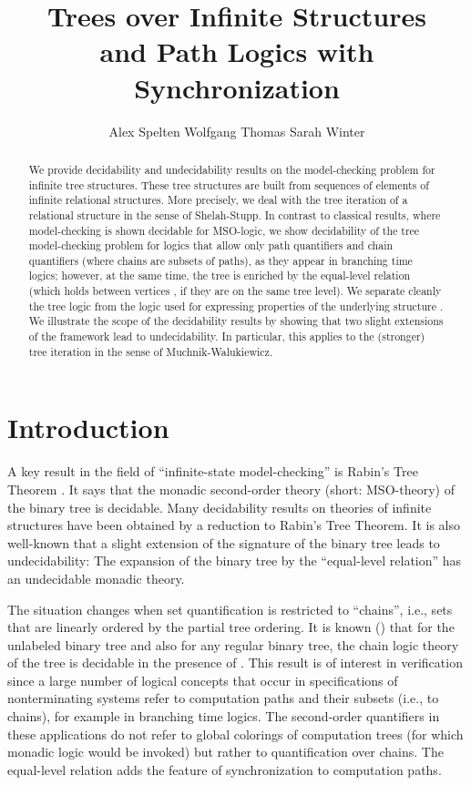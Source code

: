 \documentclass[copyright,creativecommons]{eptcs}
\title{Trees over Infinite Structures \\ and Path Logics with Synchronization}
\author{Alex Spelten \qquad Wolfgang Thomas \qquad Sarah Winter
\institute{RWTH Aachen University\\ Germany}
\email{\{spelten,thomas,winter\}@automata.rwth-aachen.de}
}
\theoremstyle{plain}
\theoremstyle{nonumberplain}
\begin{document}
\maketitle

\begin{abstract}
We provide decidability and undecidability results on 
the model-checking problem for infinite tree structures. 
These tree structures are built from sequences of  
elements of infinite relational structures. More 
precisely, we deal with the tree iteration of a relational 
structure  in the sense of Shelah-Stupp. 
In contrast to classical results, where 
model-checking is shown decidable for MSO-logic, we 
show decidability of the tree model-checking problem 
for logics that allow only path quantifiers and chain 
quantifiers (where chains are subsets of paths), as they appear 
in branching time logics; however, at the same time,  
the tree is enriched by the equal-level relation 
(which holds between vertices ,  if they are on 
the same tree level). We separate cleanly the tree logic 
from the logic used for expressing properties of the underlying 
structure . 
We illustrate the scope of the decidability results by showing 
that two slight extensions of the framework lead to undecidability.
In particular, this applies to the (stronger) tree iteration in 
the sense of Muchnik-Walukiewicz. 

\end{abstract}



\section{Introduction}\label{sec_intro}



A key result in the field of ``infinite-state model-checking'' is 
Rabin's Tree Theorem \cite{rab69}. 
It says that the monadic second-order theory (short: MSO-theory) 
of the binary tree 
is decidable. Many decidability results on theories of infinite
structures have been obtained by a reduction to Rabin's Tree Theorem. 
It is also well-known that a slight extension of the signature of 
the binary tree leads to undecidability: The expansion of the binary tree by the ``equal-level relation''  
has an undecidable monadic theory. 

The situation changes when set quantification is restricted to ``chains'', 
i.e., sets that are linearly ordered by the partial tree ordering. It is known 
(\cite{tho90}) that for the unlabeled binary tree and also for any regular binary 
tree, the chain logic theory of the tree is decidable in the presence of . 
This result is of interest in verification since a large number of logical 
concepts that occur in specifications of nonterminating systems refer to 
computation paths and their subsets (i.e., to chains), for example in branching time 
logics. The second-order quantifiers in these applications do not refer to global colorings 
of computation trees (for which monadic logic would be invoked) but rather 
to quantification over chains. The equal-level relation adds the feature 
of synchronization to computation paths. 
\end{document}
